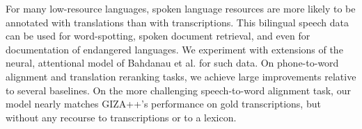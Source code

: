 For many low-resource languages, spoken language resources are more likely to be annotated with translations than with transcriptions. This bilingual speech data can be used for word-spotting, spoken document retrieval, and even for documentation of endangered languages. We experiment with extensions of the neural, attentional model of Bahdanau et al. for such data. On phone-to-word alignment and translation reranking tasks, we achieve large improvements relative to several baselines. On the more challenging speech-to-word alignment task, our model nearly matches GIZA++'s performance on gold transcriptions, but without any recourse to transcriptions or to a lexicon.
